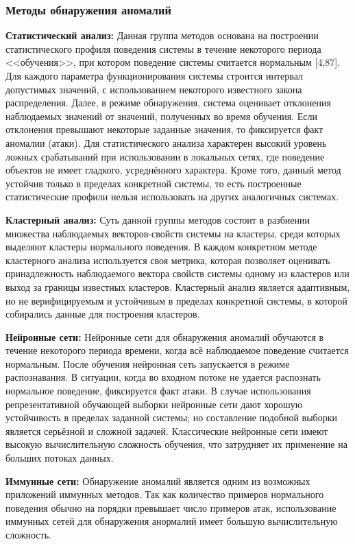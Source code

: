 \subsubsection{Методы обнаружения аномалий}

\textbf{Статистический анализ:} Данная группа методов основана на построении статистического профиля поведения системы в течение некоторого периода <<обучения>>, при котором поведение системы считается нормальным [4,87]. Для каждого параметра функционирования системы строится интервал допустимых значений, с использованием некоторого известного закона распределения. Далее, в режиме обнаружения, система оценивает отклонения наблюдаемых значений от значений, полученных во время обучения. Если отклонения превышают некоторые заданные значения, то фиксируется факт аномалии (атаки). Для статистического анализа характерен высокий уровень ложных срабатываний при использовании в локальных сетях, где поведение объектов не имеет гладкого, усреднённого характера. Кроме того, данный метод устойчив только в пределах конкретной системы, то есть построенные статистические профили нельзя использовать на других аналогичных системах. 

\textbf{Кластерный анализ:} Суть данной группы методов состоит в разбиении множества наблюдаемых векторов-свойств системы на кластеры, среди которых выделяют кластеры нормального поведения. В каждом конкретном методе кластерного анализа используется своя метрика, которая позволяет оценивать принадлежность наблюдаемого вектора свойств системы одному из кластеров или выход за границы известных кластеров. Кластерный анализ является адаптивным, но не верифицируемым и устойчивым в пределах конкретной системы, в которой собирались данные для построения кластеров.

\textbf{Нейронные сети:} Нейронные сети для обнаружения аномалий обучаются в течение некоторого периода времени, когда всё наблюдаемое поведение считается нормальным. После обучения нейронная сеть запускается в режиме распознавания. В ситуации, когда во входном потоке не удается распознать нормальное поведение, фиксируется факт атаки. В случае использования репрезентативной обучающей выборки нейронные сети дают хорошую устойчивость в пределах заданной системы; но составление подобной выборки является серьёзной и сложной задачей.  Классические нейронные сети имеют высокую вычислительную сложность обучения, что затрудняет их применение на больших потоках данных. 

\textbf{Иммунные сети:} Обнаружение аномалий является одним из возможных приложений иммунных методов. Так как количество примеров нормального поведения обычно на порядки превышает число примеров атак, использование иммунных сетей для обнаружения анормалий имеет большую вычислительную сложность. 

